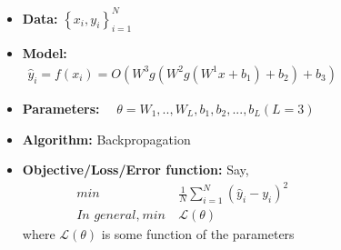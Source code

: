 \begin{frame}
  \begin{columns}
    \begin{overlayarea}{\textwidth}{\textheight}
      \makebox[\textwidth][c]{\usebox{\nncontent}}
    \end{overlayarea}

     {
      \begin{itemize}
        \item <1-> \textbf{Data:} $\left\{ x_{i},y_{i} \right\}_{i=1}^{N}$
        \item <2->  \textbf{Model:} \begin{align*}\hat y_{i} = f(x_{i}) = O(W^{3}g(W^{2}g(W^{1}x+b_{1})+b_{2})+b_{3})\end{align*}
        \item <3-> \textbf{Parameters:} $\quad \theta = {W_{1}, .., W_{L}, b_1, b_2, ... , b_L} (L =3)$
        \item <4-> \textbf{Algorithm:} Backpropagation
        \item <5-> \textbf{Objective/Loss/Error function:} Say,
            \vspace{-0.2in}
            \begin{align*}
              min                        & ~ \frac{1}{N} \sum_{i=1}^{N} (\hat y_{i} - y_{i})^{2} \\
              \textit{In general,} ~ min & ~ \mathscr{L}(\theta)
            \end{align*}
            where $\mathscr{L}(\theta)$ is some function of the parameters
      \end{itemize}
    }
  \end{columns}
\end{frame}
